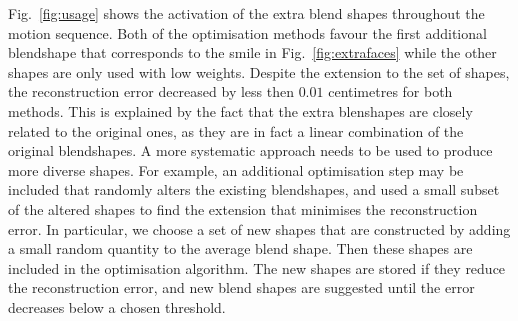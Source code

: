 \documentclass[11pt]{report}
\begin{document}
Fig.~\ref{fig:usage} shows the activation of the extra blend shapes throughout the motion sequence. Both of the optimisation methods favour the first additional blendshape that corresponds to the smile in Fig.~\ref{fig:extrafaces} while the other shapes are only used with low weights. Despite the extension to the set of shapes, the reconstruction error decreased by less then $0.01$ centimetres for both methods. This is explained by the fact that the extra blenshapes are closely related to the original ones, as they are in fact a linear combination of the original blendshapes. A more systematic approach needs to be used to produce more diverse shapes. For example, an additional optimisation step may be included that randomly alters the existing blendshapes, and used a small subset of the altered shapes to find the extension that minimises the reconstruction error. In particular, we choose a set of new shapes that are constructed by adding a small random quantity to the average blend shape. Then these shapes are included in the optimisation algorithm. The new shapes are stored if they reduce the reconstruction error, and new blend shapes are suggested until the error decreases below a chosen threshold. 

\end{document}
